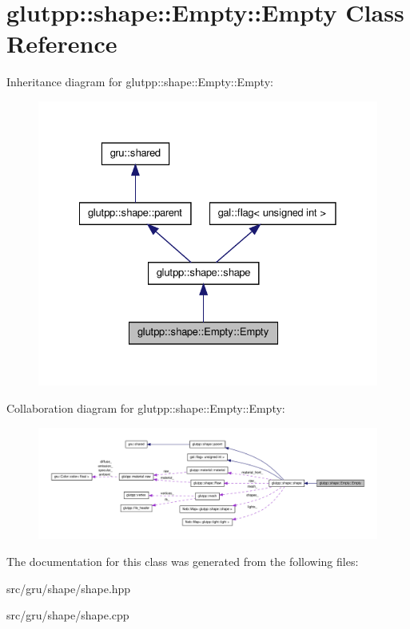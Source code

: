 \hypertarget{classglutpp_1_1shape_1_1Empty_1_1Empty}{\section{glutpp\-:\-:shape\-:\-:\-Empty\-:\-:\-Empty \-Class \-Reference}
\label{classglutpp_1_1shape_1_1Empty_1_1Empty}
}


\-Inheritance diagram for glutpp\-:\-:shape\-:\-:\-Empty\-:\-:\-Empty\-:
\nopagebreak
\begin{figure}[H]
\begin{center}
\leavevmode
\includegraphics[width=328pt]{classglutpp_1_1shape_1_1Empty_1_1Empty__inherit__graph}
\end{center}
\end{figure}


\-Collaboration diagram for glutpp\-:\-:shape\-:\-:\-Empty\-:\-:\-Empty\-:
\nopagebreak
\begin{figure}[H]
\begin{center}
\leavevmode
\includegraphics[width=350pt]{classglutpp_1_1shape_1_1Empty_1_1Empty__coll__graph}
\end{center}
\end{figure}


\-The documentation for this class was generated from the following files\-:\begin{DoxyCompactItemize}
\item 
src/gru/shape/shape.\-hpp\item 
src/gru/shape/shape.\-cpp\end{DoxyCompactItemize}
